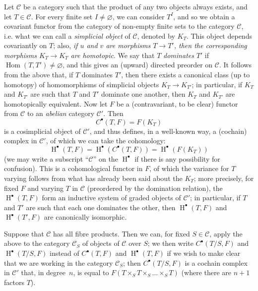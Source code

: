 \documentclass{article}
\theoremstyle{plain}
\theoremstyle{definition}
\newcommand{\cat}[1]{{\mathcal{#1}}}
\DeclareMathOperator{\Hom}{Hom}
\DeclareMathOperator{\HH}{H}
\newcommand{\oldpage}[1]{\marginpar{\footnotesize$\Big\vert$ \textit{p.~#1}}}
\begin{document}
\subsubsection{}
\label{A.4.a}

Let $\cat{C}$ be a category such that the product of any two objects always exists, and let $T\in\cat{C}$.
For every finite set $I\neq\varnothing$, we can consider $T^I$, and so we obtain a covariant functor from the category of non-empty finite sets to the category $\cat{C}$, i.e. what we can call a \emph{simplicial object} of $\cat{C}$, denoted by $K_T$.
This object depends covariantly on $T$;
also, \emph{if $u$ and $v$ are morphisms $T\to T'$, then the corresponding morphisms $K_T\to K_{T}$ are homotopic}.
We say that $T$ \emph{dominates} $T'$ if $\Hom(T,T')\neq\varnothing$, and this gives an (upward) directed preorder on $\cat{C}$.
It follows from the above that, if $T$ dominates $T'$, then there exists a canonical class (up to homotopy) of homomorphisms of simplicial objects $K_T\to K_{T'}$;
in particular, if $K_T$ and $K_{T'}$ are such that $T$ and $T'$ dominate one another, then $K_T$ and $K_{T'}$ are homotopically equivalent.
Now let $F$ be a (contravariant, to be clear) functor from $\cat{C}$ to an \emph{abelian} category $\cat{C}'$.
Then
\[
  C^\bullet(T,F) = F(K_T)
\]
is a cosimplicial object of $\cat{C}'$, and thus defines, in a well-known way, a (cochain) complex in $\cat{C}'$, of which we can take the cohomology:
\[
  \HH^\bullet(T,F)
  = \HH^\bullet(C^\bullet(T,F))
  = \HH^\bullet(F(K_T))
\]
(we may write a subscript ``$\cat{C}$'' on the $\HH^\bullet$ if there is any possibility for confusion).
This is a cohomological functor in $F$, of which the variance for $T$ varying follows from what has already been said about the $K_T$;
more precisely, for fixed $F$ and varying $T$ in $\cat{C}$ (preordered by the domination relation), the $\HH^\bullet(T,F)$ form an inductive system of graded objects of $\cat{C}'$;
in particular, if $T$ and $T'$ are such that each one dominates the other, then $\HH^\bullet(T,F)$ and $\HH^\bullet(T',F)$ are canonically isomorphic.

Suppose that $\cat{C}$ has all fibre products.
Then we can, for fixed $S\in\cat{C}$, apply the above to the category $\cat{C}_S$ of objects of $\cat{C}$ over $S$;
we then write $C^\bullet(T/S,F)$ and $\HH^\bullet(T/S,F)$ instead of $C^\bullet(T,F)$ and $\HH^\bullet(T,F)$ if we wish to make clear that we are working in the category $\cat{C}_S$;
then
\oldpage{190-13}
$C^\bullet(T/S,F)$ is a cochain complex in $\cat{C}'$ that, in degree~$n$, is equal to $F(T\times_S T\times_S\ldots\times_S T)$ (where there are $n+1$ factors $T$).
\end{document}
